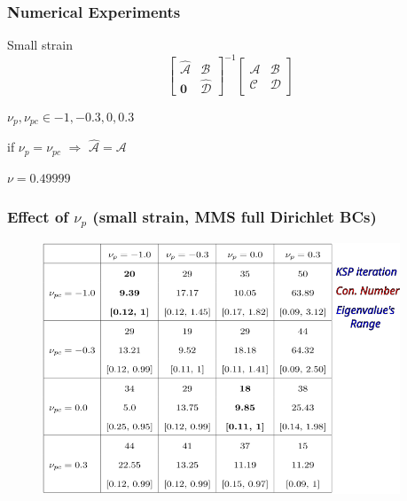 \documentclass{beamer}
\newcommand{\bm}{\boldsymbol}
\begin{document}
\begin{frame}
	\frametitle{Numerical Experiments}
	
	\huge{Small strain
	$$
	\begin{bmatrix}
		\mathcal{\hat A} & \mathcal B \\
		\bm 0 & \mathcal{\hat D}
	\end{bmatrix}^{-1} \begin{bmatrix}
		\mathcal{A} & \mathcal B \\
		\mathcal C & \mathcal{D}
	\end{bmatrix}
	$$}

	\vspace{5mm}
	$\nu_p, \nu_{pc} \in {-1, -0.3, 0, 0.3}$

	\vspace{5mm}
	\alert{if $\nu_p = \nu_{pc}$ $\Longrightarrow$ $\mathcal{\hat A} = \mathcal{A}$}

	\vspace{5mm}
	$\nu=0.49999$
\end{frame}

\begin{frame}
	\frametitle{Effect of $\nu_p$ (small strain, MMS full Dirichlet BCs)}
	\begin{figure} [h]
		\includegraphics[width=0.95\textwidth]{../figs/blockpc-mixed-linear-mms.png}
	\end{figure}
\end{frame}
\end{document}
